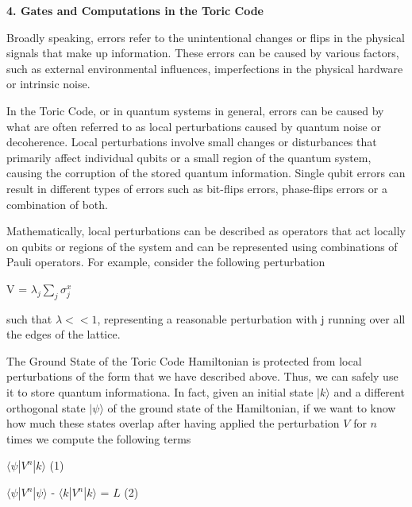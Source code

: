 \documentclass[12pt]{report}
\begin{document}
 
	\begin{minipage}{1 \textwidth}
		
		
		\textbf{4. Gates and Computations in the Toric Code}\newline 
		
		Broadly speaking, errors refer to the unintentional changes or flips in the physical signals that make up information. These errors can be caused by various factors, such as external environmental influences, imperfections in the physical hardware or intrinsic noise. \newline
		
		In the Toric Code, or in quantum systems in general, errors can be caused by what are often referred to as local perturbations caused by quantum noise or decoherence. Local perturbations involve small changes or disturbances that primarily affect individual qubits or a small region of the quantum system, causing the corruption of the stored quantum information. Single qubit errors can result in different types of errors such as bit-flips errors, phase-flips errors or a combination of both. \newline
		
		Mathematically, local perturbations can be described as operators that act locally on qubits or regions of the system and can be represented using combinations of Pauli operators. For example, consider the following perturbation
		
		\begin{center}
			V = $\lambda_j \sum_{j} \sigma^x_j $
		\end{center}
		
		such that $\lambda << 1 $, representing a reasonable perturbation with j running over all the edges of the lattice. \newline
		
		The Ground State of the Toric Code Hamiltonian is protected from local perturbations of the form that we have described above. Thus, we can safely use it to store quantum informationa. In fact, given an initial state $ |k \rangle $ and  a different orthogonal state $ |\psi \rangle $ of the ground state of the Hamiltonian, if we want to know how much these states overlap after having applied the perturbation $V$ for $n$ times we compute the following terms\newline
		
		\begin{center}
			$ \langle \psi|V^n| k \rangle$                                          (1)
		\end{center}
		\begin{center}
			 $ \langle \psi|V^n| \psi \rangle$ - $ \langle k|V^n| k \rangle$ = $L$  (2)
		\end{center}
		

\end{minipage}
\end{document}
